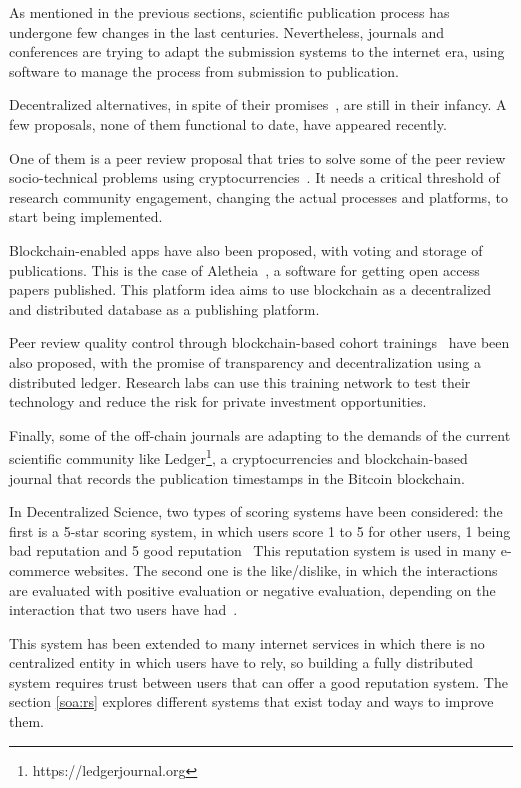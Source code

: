As mentioned in the previous sections, scientific publication process has
undergone few changes in the last centuries. Nevertheless, journals and
conferences are trying to adapt the submission systems to the internet era,
using software to manage the process from submission to publication.



Decentralized alternatives, in spite of their
promises~\cite{bartlingblockchain}, are still in their infancy. A few proposals,
none of them functional to date, have appeared recently.

One of them is a peer review proposal that tries to solve some of the peer
review socio-technical problems using cryptocurrencies~\cite{tennant2017multi}.
It needs a critical threshold of research community engagement, changing the
actual processes and platforms, to start being implemented.

Blockchain-enabled apps have also been proposed, with voting and storage of
publications. This is the case of Aletheia~\cite{morton2017aletheia}, a software
for getting open access papers published. This platform idea aims to use
blockchain as a decentralized and distributed database as a publishing platform.

Peer review quality control through blockchain-based cohort
trainings~\cite{dhillon2016bench} have been also proposed, with the promise of
transparency and decentralization using a distributed ledger. Research labs can
use this training network to test their technology and reduce the risk for
private investment opportunities.

Finally, some of the off-chain journals are adapting to the demands of the
current scientific community like Ledger\footnote{https://ledgerjournal.org}, a
cryptocurrencies and blockchain-based journal that records the publication
timestamps in the Bitcoin blockchain.


In Decentralized Science, two types of scoring systems have been considered: the
first is a 5-star scoring system, in which users score 1 to 5 for other users, 1
being bad reputation and 5 good reputation~\cite{} This reputation system is
used in many e-commerce websites. The second one is the like/dislike, in which
the interactions are evaluated with positive evaluation or negative evaluation,
depending on the interaction that two users have had~\cite{}.

This system has been extended to many internet services in which there is no
centralized entity in which users have to rely, so building a fully distributed
system requires trust between users that can offer a good reputation system. The
section \ref{soa:rs} explores different systems that exist today and ways to
improve them.

